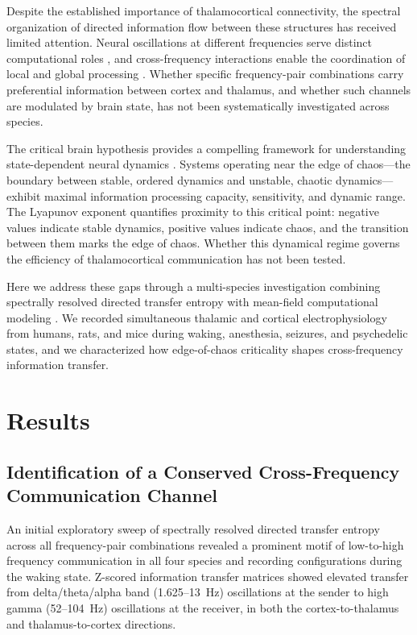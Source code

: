 \documentclass[11pt]{article}
\begin{document}
Despite the established importance of thalamocortical connectivity, the spectral organization of directed information flow between these structures has received limited attention. Neural oscillations at different frequencies serve distinct computational roles \citep{canolty2010importance}, and cross-frequency interactions enable the coordination of local and global processing \citep{palva2005neural}. Whether specific frequency-pair combinations carry preferential information between cortex and thalamus, and whether such channels are modulated by brain state, has not been systematically investigated across species.

The critical brain hypothesis provides a compelling framework for understanding state-dependent neural dynamics \citep{beggs2003neuronal, shew2013functional}. Systems operating near the edge of chaos---the boundary between stable, ordered dynamics and unstable, chaotic dynamics---exhibit maximal information processing capacity, sensitivity, and dynamic range. The Lyapunov exponent quantifies proximity to this critical point: negative values indicate stable dynamics, positive values indicate chaos, and the transition between them marks the edge of chaos. Whether this dynamical regime governs the efficiency of thalamocortical communication has not been tested.

Here we address these gaps through a multi-species investigation combining spectrally resolved directed transfer entropy \citep{schreiber2000measuring} with mean-field computational modeling \citep{vanalbada2009mean}. We recorded simultaneous thalamic and cortical electrophysiology from humans, rats, and mice during waking, anesthesia, seizures, and psychedelic states, and we characterized how edge-of-chaos criticality shapes cross-frequency information transfer.

\section{Results}

\subsection{Identification of a Conserved Cross-Frequency Communication Channel}

An initial exploratory sweep of spectrally resolved directed transfer entropy across all frequency-pair combinations revealed a prominent motif of low-to-high frequency communication in all four species and recording configurations during the waking state. Z-scored information transfer matrices showed elevated transfer from delta/theta/alpha band (1.625--13~Hz) oscillations at the sender to high gamma (52--104~Hz) oscillations at the receiver, in both the cortex-to-thalamus and thalamus-to-cortex directions.
\end{document}
